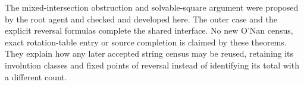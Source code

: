 \documentclass[11pt,a4paper]{article}
\begin{document}
The mixed-intersection obstruction and solvable-square argument were
proposed by the root agent and checked and developed here. The outer
case and the explicit reversal formulas complete the shared interface.
No new O'Nan census, exact rotation-table entry or source completion is
claimed by these theorems. They explain how any later accepted string
census may be reused, retaining its involution classes and fixed points
of reversal instead of identifying its total with a different count.
\end{document}
